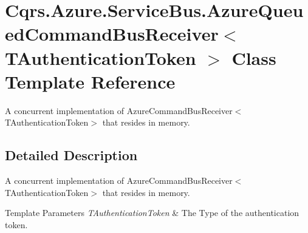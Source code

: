 \hypertarget{classCqrs_1_1Azure_1_1ServiceBus_1_1AzureQueuedCommandBusReceiver}{}\section{Cqrs.\+Azure.\+Service\+Bus.\+Azure\+Queued\+Command\+Bus\+Receiver$<$ T\+Authentication\+Token $>$ Class Template Reference}
\label{classCqrs_1_1Azure_1_1ServiceBus_1_1AzureQueuedCommandBusReceiver}


A concurrent implementation of Azure\+Command\+Bus\+Receiver$<$\+T\+Authentication\+Token$>$ that resides in memory.  




\subsection{Detailed Description}
A concurrent implementation of Azure\+Command\+Bus\+Receiver$<$\+T\+Authentication\+Token$>$ that resides in memory. 


\begin{DoxyTemplParams}{Template Parameters}
{\em T\+Authentication\+Token} & The Type of the authentication token.\\
\hline
\end{DoxyTemplParams}
